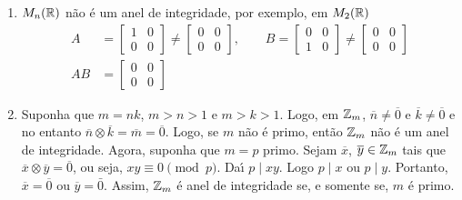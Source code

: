\documentclass{beamer}
\begin{document}
    \begin{frame}
        \begin{exemplos}
            \begin{enumerate}[label={\arabic*})]
                \conti

                \item $M_{n}(\mathbb{R})$ n{\~a}o {\'e} um anel de integridade, por exemplo, em $M_{2}(\mathbb{R})$
                \begin{align*}
                    A &= \begin{bmatrix}
                        1 & 0\\
                        0 & 0
                    \end{bmatrix} \neq \begin{bmatrix}
                        0 & 0\\
                        0 & 0       
                    \end{bmatrix},\qquad 
                    B = \begin{bmatrix}
                        0 & 0\\
                        1 & 0
                    \end{bmatrix} \neq \begin{bmatrix}
                        0 & 0\\
                        0 & 0
                    \end{bmatrix}\\
                    AB & =\begin{bmatrix}
                        0 & 0\\
                        0 & 0
                    \end{bmatrix}
                \end{align*}

                \vspace{.5cm}
                
                \item Suponha que $m = nk$, $m > n > 1$ e $m > k > 1$. Logo, em $\mathbb{Z}_m$, $\overline{n} \neq \overline{0}$ e $\overline{k} \neq \overline{0}$ e no entanto $\overline{n} \otimes \overline{k} = \overline{m} = \overline{0}$. Logo, se $m$ n{\~a}o {\'e} primo, ent{\~a}o $\mathbb{Z}_m$ n{\~a}o {\'e} um anel de integridade. Agora, suponha que $m = p$ primo. Sejam $\overline{x}$, $\overline{y} \in \mathbb{Z}_m$ tais que $\overline{x}\otimes \overline{y} = \overline{0}$, ou seja, $xy \equiv 0 \pmod p$. Da{\'\i} $p\mid xy$. Logo $p\mid x$ ou $p\mid y$. Portanto, $\overline{x} = \overline{0}$ ou $\overline{y} = \bar{0}$. Assim, $\mathbb{Z}_m$ {\'e} anel de integridade se, e somente se, $m$ {\'e} primo.
            \end{enumerate}
        \end{exemplos}
    \end{frame}
\end{document}
